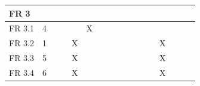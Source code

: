 \documentclass[a4paper,12pt]{article}
\begin{document}
\begin{longtable}
{\begin{tabular}{|l|c|c|c|c|c|c|c|c|c|c|c|c|c|c|c|c|}
				FR 3   &                               &                             &                             &                             &                             &                             &                             &                             &                             &                             &                             &                             &                             &                             &                             &                             \\ \hline
				FR 3.1 & 4                             &                             &                             &                             & X                           &                             &                             &                             &                             &                             &                             &                             &                             &                             &                             &                             \\
				FR 3.2 & 1                             &                             &                             & X                           &                             &                             &                             &                             &                             &                             &                             &                             & X                           &                             &                             &                             \\
				FR 3.3 & 5                             &                             &                             & X                           &                             &                             &                             &                             &                             &                             &                             &                             & X                           &                             &                             &                             \\
				FR 3.4 & 6                             &                             &                             & X                           &                             &                             &                             &                             &                             &                             &                             &                             & X                           &                             &                             &                             \\

\end{tabular}}
\end{longtable}
\end{document}

